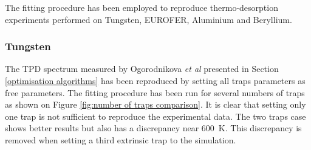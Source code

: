 

The fitting procedure has been employed to reproduce thermo-desorption experiments performed on Tungsten, EUROFER, Aluminium and Beryllium.


\subsubsection{Tungsten}

The TPD spectrum measured by Ogorodnikova \textit{et al} presented in Section \ref{optimisation algorithms} has been reproduced by setting all traps parameters as free parameters.
The fitting procedure has been run for several numbers of traps as shown on Figure \ref{fig:number of traps comparison}.
It is clear that setting only one trap is not sufficient to reproduce the experimental data.
The two traps case shows better results but also has a discrepancy near \SI{600}{K}.
This discrepancy is removed when setting a third extrinsic trap to the simulation.

